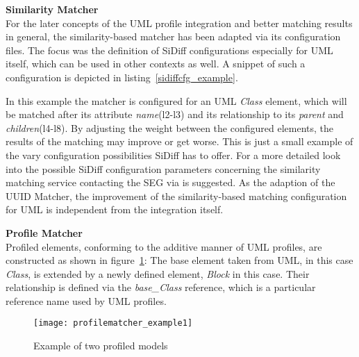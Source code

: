 \textbf{Similarity Matcher}\\
For the later concepts of the \ac{UML} profile integration and better matching
results in general, the similarity-based matcher has been adapted via its
configuration files. The focus was the definition of SiDiff configurations especially for
\ac{UML} itself, which can be used in other contexts as well. A snippet of such
a configuration is depicted in listing~\ref{sidiffcfg_example}.


In this example the matcher is configured for an \ac{UML} \textit{Class}
element, which will be matched after its attribute \textit{name}(l2-l3) and its
relationship to its \textit{parent} and \textit{children}(l4-l8). By adjusting
the weight between the configured elements, the results of the matching may improve or get worse.
This is just a small example of the vary configuration possibilities SiDiff has to offer. For a more detailed look into the possible SiDiff configuration parameters concerning the similarity
matching service contacting the \ac{SEG} via \cite{SEGURL} is suggested. As the
adaption of the \ac{UUID} Matcher, the improvement of the similarity-based matching
configuration for \ac{UML} is independent from the integration itself.

\textbf{Profile Matcher}\\
Profiled elements, conforming to the additive manner of \ac{UML} profiles, are
constructed as shown in figure~\ref{profilematcher_example1}: The base element
taken from \ac{UML}, in this case \textit{Class}, is extended by a newly defined
element, \textit{Block} in this case. Their relationship is defined via the
\textit{base\_Class} reference, which is a particular reference name used by
\ac{UML} profiles.

\begin{figure}[h!]
\begin{center}
\texttt{[image: profilematcher\_example1]}\\
\end{center}
\caption{Example of two profiled models}
\label{profilematcher_example1}
\end{figure}

